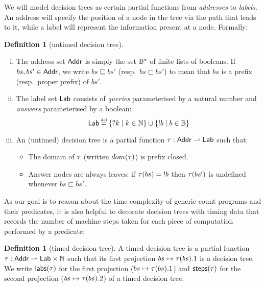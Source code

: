 \documentclass[12pt,phd,lfcs,twoside,openright,logo,leftchapter,normalheadings]{infthesis}
\theoremstyle{plain}
\theoremstyle{definition}
\newtheorem{definition}[theorem]{Definition}
\begin{document}
We will model decision trees as certain partial functions from
\emph{addresses} to \emph{labels}.  An address will specify the
position of a node in the tree via the path that leads to it, while a
label will represent the information present at a node. Formally:

\begin{definition}[untimed decision tree]\label{def:decision-tree}
  ~
  \begin{enumerate}[(i)]
  \item The address set $\mathsf{Addr}$ is simply the set $\mathbb{B}^\ast$ of finite
    lists of booleans.  If $bs,bs' \in \mathsf{Addr}$, we write
    $bs \sqsubseteq bs'$ (resp.\ $bs \sqsubset bs'$) to mean that $bs$
    is a prefix (resp.\ proper prefix) of $bs'$.

  \item The label set $\mathsf{Lab}$ consists of \emph{queries} parameterised
    by a natural number and \emph{answers} parameterised by a boolean:
 {
  \[
  \Lab \defas \{\query k \mid k \in \N \} \cup \{\ans b \mid b \in \B \}
  \]
}%

\item An (untimed) decision tree is a partial function
  $\tau : \mathsf{Addr} \rightharpoonup \mathsf{Lab}$ such that:
\begin{itemize}
  \item The domain of $\tau$ (written $dom(\tau)$) is prefix closed.
  \item Answer nodes are always leaves:
    if $\tau(bs) = \mathord{!} b$ then $\tau(bs')$ is undefined whenever $bs \sqsubset bs'$.
  \end{itemize}
\end{enumerate}
\end{definition}

As our goal is to reason about the time complexity of generic count
programs and their predicates, it is also helpful to decorate decision
trees with timing data that records the number of machine steps taken
for each piece of computation performed by a predicate:

\begin{definition}[timed decision tree]\label{def:timed-decision-tree}
A timed decision tree is a partial function $\tau : \mathsf{Addr} \rightharpoonup
\mathsf{Lab} \times \mathbb{N}$ such that its first projection $bs \mapsto \tau(bs).1$
is a decision tree.
%
We write $\mathsf{labs}(\tau)$ for the first projection ($bs \mapsto \tau(bs).1$) and
$\mathsf{steps}(\tau)$ for the second projection ($bs \mapsto \tau(bs).2$) of a timed
decision tree.
\end{definition}
\end{document}
